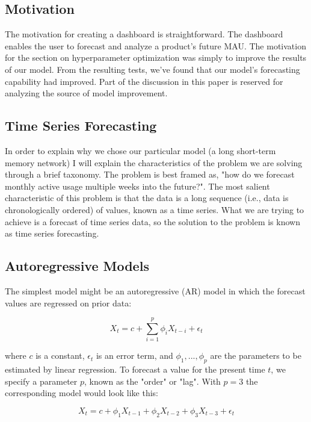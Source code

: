\documentclass[11pt, oneside]{article}
\begin{document}
\subsection{Motivation}
The motivation for creating a dashboard is straightforward. The dashboard enables the user to forecast and analyze a product's future MAU.
The motivation for the section on hyperparameter optimization was simply to improve the results of our model. From the resulting tests, we've found that our model's forecasting capability had improved. Part of the discussion in this paper is reserved for analyzing the source of model improvement.

\subsection{Time Series Forecasting}

In order to explain why we chose our particular model (a long short-term memory network) I will explain the characteristics of the problem we are solving through a brief taxonomy. The problem is best framed as, "how do we forecast monthly active usage multiple weeks into the future?". The most salient characteristic of this problem is that the data is a long sequence (i.e., data is chronologically ordered) of values, known as a time series. What we are trying to achieve is a forecast of time series data, so the solution to the problem is known as time series forecasting.

\subsection{Autoregressive Models}

The simplest model might be an autoregressive (AR) model in which the forecast values are regressed on prior data:

\begin{equation}
  \label{eq:1}
  X_t = c + \sum_{i=1}^p \phi_i X_{t-i} + \epsilon_t
\end{equation}

where $c$ is a constant, $\epsilon_t$ is an error term, and $\phi_1, ..., \phi_p$ are the parameters to be estimated by linear regression. To forecast a value for the present time $t$, we specify a parameter $p$, known as the "order" or "lag". With $p=3$ the corresponding model would look like this:

\begin{equation}
  \label{eq:2}
  X_t = c + \phi_1 X_{t-1} + \phi_2 X_{t-2} + \phi_3 X_{t-3} + \epsilon_t
\end{equation}
\end{document}
